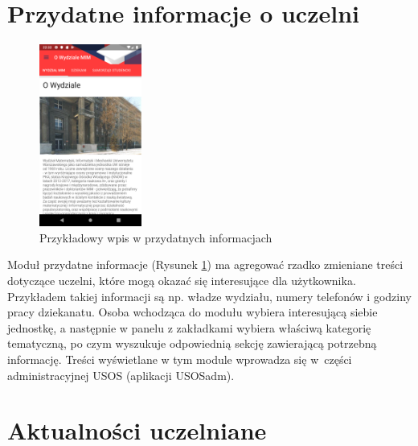 \documentclass{pracamgr}
\begin{document}
\section{Przydatne informacje o uczelni}

\begin{figure}[p]
	\centering
		\includegraphics[width=0.3\textwidth]{img/guide.png}
	\caption{Przykładowy wpis w przydatnych informacjach}\label{fig:guide}
	\medskip
\end{figure}

Moduł przydatne informacje (Rysunek \ref{fig:guide}) ma agregować rzadko zmieniane treści dotyczące uczelni,
które mogą okazać się interesujące dla użytkownika. Przykładem takiej informacji
są np. władze wydziału, numery telefonów i godziny pracy dziekanatu. Osoba wchodząca
do modułu wybiera interesującą siebie jednostkę, a następnie w panelu z zakładkami
wybiera właściwą kategorię tematyczną, po czym wyszukuje odpowiednią sekcję
zawierającą potrzebną informację. Treści wyświetlane w tym module wprowadza się w~części
administracyjnej USOS (aplikacji USOSadm).

\section{Aktualności uczelniane}
\end{document}
